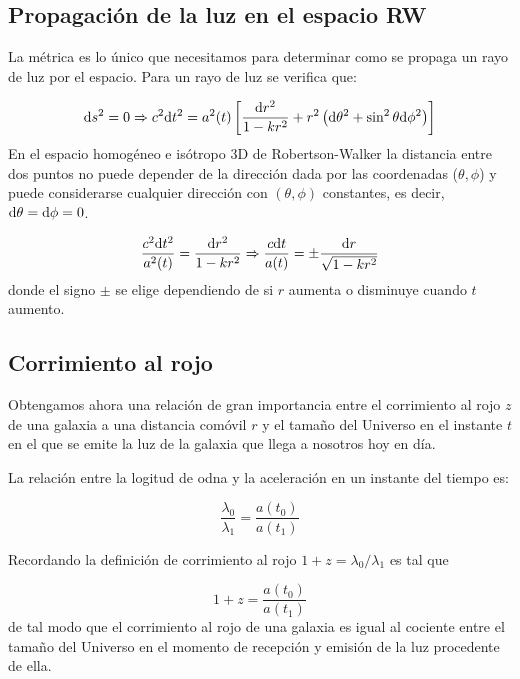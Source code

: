 \subsection{Propagación de la luz en el espacio RW}

La métrica es lo único que necesitamos para determinar como se propaga un rayo de luz por el espacio. Para un rayo de luz se verifica que: 

\begin{equation}
    \mathrm{d} s^2 = 0  \Rightarrow c^2 \mathrm{d} t^2 = a^2(t) \left[ \frac{\mathrm{d} r^2}{1-kr^2}+r^2 \left( \mathrm{d} \theta^2 + \sin^2 \theta \mathrm{d} \phi^2 \right) \right]
\end{equation}
En el espacio homogéneo e isótropo 3D de Robertson-Walker la distancia entre dos puntos no puede depender de la dirección dada por las coordenadas ($\theta,\phi$) y puede considerarse cualquier dirección con $(\theta,\phi)$ constantes, es decir, $\mathrm{d} \theta = \mathrm{d} \phi = 0$.

\begin{equation}
    \frac{c^2 \mathrm{d} t^2}{a^2(t)} = \frac{\mathrm{d} r^2}{1-kr^2} \Rightarrow  \frac{c \mathrm{d}  t}{a(t)} = \pm\frac{\mathrm{d} r}{\sqrt{1-kr^2}}
\end{equation}
donde el signo $\pm$ se elige dependiendo de si $r$ aumenta o disminuye cuando $t$ aumento. 


\subsection{Corrimiento al rojo}

Obtengamos ahora una relación de gran importancia entre el corrimiento al rojo $z$ de una galaxia a una distancia comóvil $r$ y el tamaño del Universo en el instante $t$ en el que se emite la luz de la galaxia que llega a nosotros hoy en día.

La relación entre la logitud de odna y la aceleración en un instante del tiempo es:
 

\begin{equation}
    \frac{\lambda_0}{\lambda_1} = \frac{a(t_0)}{a(t_1)}
\end{equation}
\begin{Anotacion}
    Recordando la definición de corrimiento al rojo $1+z=\lambda_0/\lambda_1$ es tal que
    
    \begin{equation}
        1 + z = \frac{a(t_0)}{a(t_1)}
    \end{equation}
    de tal modo que el corrimiento al rojo de una galaxia es igual al cociente entre el tamaño del Universo en el momento de recepción y emisión de la luz procedente de ella. 
\end{Anotacion}

